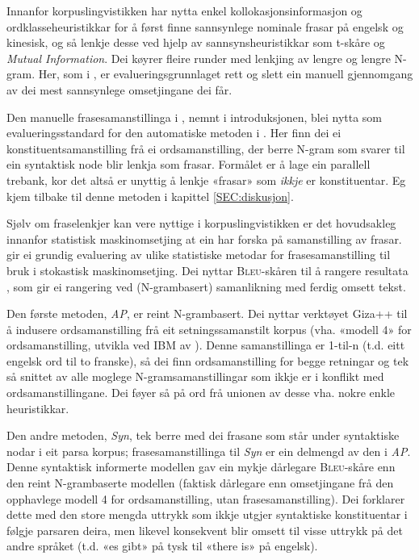 \documentclass[12pt,a4paper,oneside,draft]{report}
\newcommand{\Bleu}{\textsc{Bleu}}
\begin{document}
Innanfor korpuslingvistikken har \citet{piao2001mwu} nytta enkel
kollokasjonsinformasjon og ordklasseheuristikkar for å først finne
sannsynlege nominale frasar på engelsk og kinesisk, og så lenkje desse
ved hjelp av sannsynsheuristikkar som t-skåre og \emph{Mutual Information}. Dei køyrer fleire runder med lenkjing av lengre og
lengre N-gram.  Her, som i \citet{kupiec1993afn}, er
evalueringsgrunnlaget rett og slett ein manuell gjennomgang av dei
mest sannsynlege omsetjingane dei får.

Den manuelle frasesamanstillinga i \citet{samuelsson2006pap}, nemnt i
introduksjonen, blei nytta som evalueringsstandard for den automatiske
metoden i \citet{samuelsson2007apa}.  Her finn dei ei
konstituentsamanstilling frå ei ordsamanstilling, der berre N-gram som
svarer til ein syntaktisk node blir lenkja som frasar. Formålet er å
lage ein parallell trebank, kor det altså er unyttig å lenkje «frasar»
som \emph{ikkje} er konstituentar. Eg kjem tilbake til denne metoden i
kapittel \ref{SEC:diskusjon}.

Sjølv om fraselenkjer kan vere nyttige i korpuslingvistikken er det
hovudsakleg innanfor statistisk maskinomsetjing at ein har forska på
samanstilling av frasar. \citet{koehn2003spb} gir ei grundig
evaluering av ulike statistiske metodar for frasesamanstilling til
bruk i stokastisk maskinomsetjing. Dei nyttar \Bleu-skåren til å
rangere resultata
\citep[Papineni~et~al.,~2001,~i][s.~51]{koehn2003spb}, som gir ei
rangering ved (N-grambasert) samanlikning med ferdig omsett tekst.

Den første metoden, \emph{AP}, er reint N-grambasert. Dei nyttar verktøyet
Giza++ \citep[Och~og~Ney,~2000,~i][s.~50]{koehn2003spb} til å indusere
ordsamanstilling frå eit setningssamanstilt korpus (vha. «modell 4»
for ordsamanstilling, utvikla ved IBM av \citet{brown1993msm}). Denne
samanstillinga er 1-til-n (t.d. eitt engelsk ord til to franske), så
dei finn ordsamanstilling for begge retningar og tek så snittet av
alle moglege N-gramsamanstillingar som ikkje er i konflikt med
ordsamanstillingane. Dei føyer så på ord frå unionen av desse
vha. nokre enkle heuristikkar.

Den andre metoden, \emph{Syn}, tek berre med dei frasane som står under
syntaktiske nodar i eit parsa korpus; frasesamanstillinga til \emph{Syn} er
ein delmengd av den i \emph{AP}. Denne syntaktisk informerte modellen gav
ein mykje dårlegare \Bleu-skåre enn den reint N-grambaserte modellen
(faktisk dårlegare enn omsetjingane frå den opphavlege modell 4 for
ordsamanstilling, utan frasesamanstilling). Dei forklarer dette med
den store mengda uttrykk som ikkje utgjer syntaktiske konstituentar i
følgje parsaren deira, men likevel konsekvent blir omsett til visse
uttrykk på det andre språket (t.d. «es gibt» på tysk til «there is» på
engelsk). 
\end{document}
